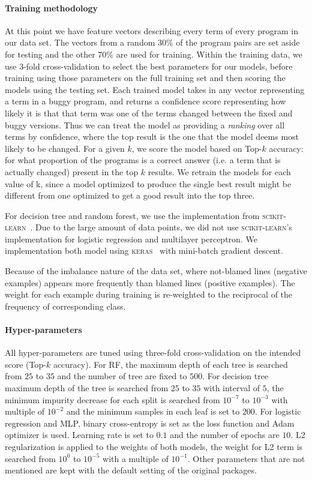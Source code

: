 \documentclass[conference]{IEEEtran}
\begin{document}
\paragraph{Training methodology}
At this point we have feature vectors describing every term of every program in
our data set. The vectors from a random 30\% of the program pairs are set aside for testing and
the other 70\% are used for training.
Within the training data, we use 3-fold
cross-validation to select the best parameters for our models, before training
using those parameters on the full training set and then scoring the models
using the testing set.
Each trained model takes in any vector representing a term
in a buggy program, and returns a confidence score representing how likely it is that
that term was one of the terms changed between the fixed and buggy versions.
Thus we can treat the model as providing a \emph{ranking} over all terms by
confidence, where the top result is the one that the model deems most likely
to be changed.
For a given $k$, we score the model based on Top-$k$ accuracy: for what
proportion of the programs is a correct answer (i.e. a term that is actually
changed) present in the top $k$ results.
We retrain the models for each value of k, since a model optimized to produce
the single best result might be different from one optimized to get a good
result into the top three.

For decision tree and random forest, we use the implementation from
\textsc{scikit-learn}~\cite{scikit-learn}.
Due to the large amount of data points, we did not use \textsc{scikit-learn}'s
implementation for logistic regression and multilayer perceptron.
We implementation both model using
\textsc{keras}~\cite{chollet2015keras} with mini-batch gradient descent.

Because of the imbalance nature of the data set, where not-blamed lines
(negative examples) appears more frequently than blamed lines (positive
examples).
The weight for each example during training is re-weighted to the reciprocal
of the frequency of corresponding class.

\paragraph{Hyper-parameters}
All hyper-parameters are tuned using three-fold cross-validation on the
intended score (Top-$k$ accuracy).
For RF, the maximum depth of each tree is searched from $25$ to $35$ and the
number of tree are fixed to $500$.
For decision tree maximum depth of the tree is searched from $25$ to $35$ with interval of $5$,
the minimum impurity decrease for each split is searched from $10^{-7}$ to
$10^{-3}$ with multiple of $10^{-2}$ and the minimum samples in each leaf is set to $200$.
For logistic regression and MLP, binary cross-entropy is set as the loss
function and Adam \cite{kingma2014adam} optimizer is used.
Learning rate is set to $0.1$ and the number of epochs are $10$.
L2 regularization is applied to the weights of both models,
the weight for L2 term is searched from $10^0$ to $10^{-5}$ with a multiple of $10^{-1}$.
Other parameters that are not mentioned are kept with the default setting of the
original packages.
\end{document}
